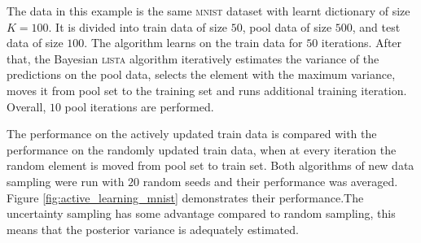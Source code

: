 \documentclass[letterpaper]{article}
\begin{document}
The data in this example is the same \textsc{mnist} dataset with learnt dictionary of size $K=100$. It is divided into train data of size $50$, pool data of size $500$,  and test data of size $100$. The algorithm learns on the train data for $50$ iterations. After that, the Bayesian \textsc{lista} algorithm iteratively estimates the variance of the predictions on the pool data, selects the element with the maximum variance, moves it from pool set to the training set and runs additional training iteration. Overall, $10$ pool iterations are performed.

The performance on the actively updated train data is compared with the performance on the randomly updated train data, when at every iteration the random element is moved from pool set to train set. Both algorithms of new data sampling were run with $20$ random seeds and their performance was averaged. Figure \ref{fig:active_learning_mnist} demonstrates their performance.The uncertainty sampling has some advantage compared to random sampling, this means that the posterior variance is adequately estimated.
\end{document}
